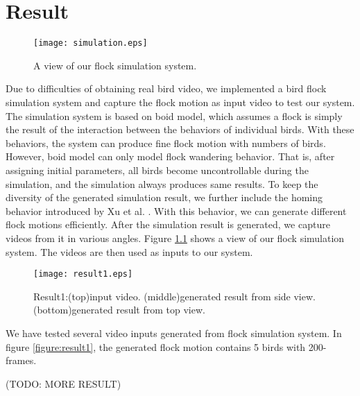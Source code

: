 \chapter{Result}


\begin{figure}[h]
 \begin{center}
  \texttt{[image: simulation.eps]}
 \end{center}
 \caption{A view of our flock simulation system.}
 \label{figure:simulation}
\end{figure}


Due to difficulties of obtaining real bird video, we implemented a bird flock simulation system and capture the flock motion as input video to test our system. The simulation system is based on boid model, which assumes a flock is simply the result of the interaction between the behaviors of individual birds. With these behaviors, the system can produce fine flock motion with numbers of birds. However, boid model can only model flock wandering behavior. That is, after assigning initial parameters, all birds become uncontrollable during the simulation, and the simulation always produces same results. To keep the diversity of the generated simulation result, we further include the homing behavior introduced by Xu et al. \cite{Shape}. With this behavior, we can generate different flock motions efficiently. After the simulation result is generated, we capture videos from it in various angles. Figure \ref{figure:simulation} shows a view of our flock simulation system. The videos are then used as inputs to our system.


\begin{figure}[h]
 \begin{center}
  \texttt{[image: result1.eps]}
 \end{center}
 \caption{Result1:(top)input video. (middle)generated result from side view. (bottom)generated result from top view.}
 \label{figure:result1_side}
\end{figure}


We have tested several video inputs generated from flock simulation system. In figure \ref{figure:result1}, the generated flock motion contains 5 birds with 200-frames.


(TODO: MORE RESULT)
